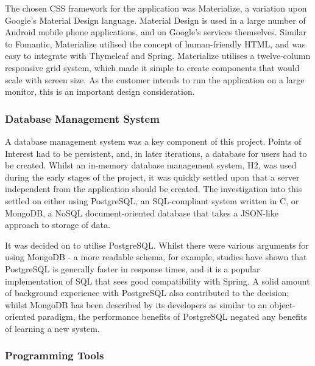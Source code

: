 The chosen CSS framework for the application was Materialize, a variation upon Google's Material Design language. Material Design is used in a large number of Android mobile phone applications, and on Google's services themselves. Similar to Fomantic, Materialize utilised the concept of human-friendly HTML, and was easy to integrate with Thymeleaf and Spring. Materialize utilises a twelve-column responsive grid system, which made it simple to create components that would scale with screen size. As the customer intends to run the application on a large monitor, this is an important design consideration.

\subsubsection{Database Management System}

A database management system was a key component of this project. Points of Interest had to be persistent, and, in later iterations, a database for users had to be created. Whilst an in-memory database management system, H2, was used during the early stages of the project, it was quickly settled upon that a server independent from the application should be created. The investigation into this settled on either using PostgreSQL, an SQL-compliant system written in C, or MongoDB, a NoSQL document-oriented database that takes a JSON-like approach to storage of data.

It was decided on to utilise PostgreSQL. Whilst there were various arguments for using MongoDB - a more readable schema, for example, studies have shown that PostgreSQL is generally faster in response times, and it is a popular implementation of SQL that sees good compatibility with Spring. A solid amount of background experience with PostgreSQL also contributed to the decision; whilst MongoDB has been described by its developers as similar to an object-oriented paradigm, the performance benefits of PostgreSQL negated any benefits of learning a new system.


\subsubsection{Programming Tools}

